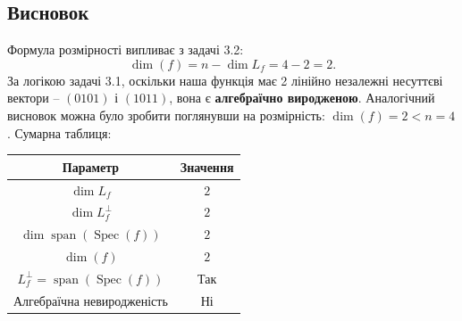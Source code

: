 \subsection{Висновок}
Формула розмірності випливає з задачі 3.2:
\begin{equation*}
    \dim(f) = n - \dim L_{f} = 4 - 2 = 2.
\end{equation*}
За логікою задачі 3.1, оскільки наша функція має 2 лінійно незалежні несуттєві вектори -- $(0101)$ і $(1011)$, 
вона є \textbf{алгебраїчно виродженою}. Аналогічний висновок можна було зробити поглянувши на розмірність: 
$\dim(f) = 2 < n = 4$. Сумарна таблиця:
\begin{center}
    \renewcommand{\arraystretch}{1.3}
    \begin{tabular}{c|c}
        Параметр                                                    & Значення \\
        \hline
        $\dim L_{f}$                                                  & $2$      \\
        $\dim L_{f}^{\perp}$                                          & $2$      \\
        $\dim \operatorname{span}(\operatorname{Spec}(f))$          & $2$      \\
        $\dim(f)$                                                   & $2$      \\
        $L_{f}^{\perp} = \operatorname{span}(\operatorname{Spec}(f))$ & Так      \\
        Алгебраїчна невиродженість                                  & Ні       \\
    \end{tabular}
\end{center}
